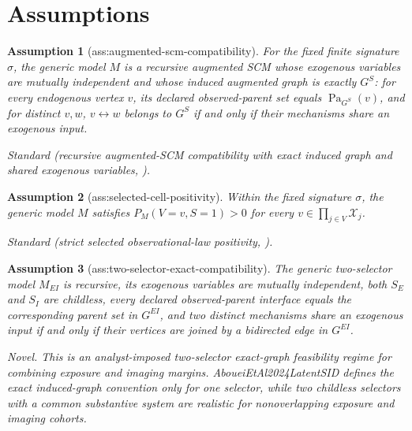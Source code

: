 \documentclass{article}
\newtheorem{assumption}{Assumption}
\begin{document}
\section{Assumptions}

\begin{assumption}[ass:augmented-scm-compatibility]\label{ass:augmented-scm-compatibility}
For the fixed finite signature \(\sigma\), the generic model \(M\) is a recursive augmented SCM whose exogenous variables are mutually independent and whose induced augmented graph is exactly \(G^S\): for every endogenous vertex \(v\), its declared observed-parent set equals \(\operatorname{Pa}_{G^S}(v)\), and for distinct \(v,w\), \(v\leftrightarrow w\) belongs to \(G^S\) if and only if their mechanisms share an exogenous input.
\par\smallskip\noindent\emph{Standard} (recursive augmented-SCM compatibility with exact induced graph and shared exogenous variables, \cite{AboueiEtAl2024LatentSID}).
\end{assumption}

\begin{assumption}[ass:selected-cell-positivity]\label{ass:selected-cell-positivity}
Within the fixed signature \(\sigma\), the generic model \(M\) satisfies \(P_M(V=v,S=1)>0\) for every \(v\in\prod_{j\in V}\mathcal X_j\).
\par\smallskip\noindent\emph{Standard} (strict selected observational-law positivity, \cite{AboueiEtAl2024LatentSID}).
\end{assumption}

\begin{assumption}[ass:two-selector-exact-compatibility]\label{ass:two-selector-exact-compatibility}
The generic two-selector model \(M_{EI}\) is recursive, its exogenous variables are mutually independent, both \(S_E\) and \(S_I\) are childless, every declared observed-parent interface equals the corresponding parent set in \(G^{EI}\), and two distinct mechanisms share an exogenous input if and only if their vertices are joined by a bidirected edge in \(G^{EI}\).
\par\smallskip\noindent\emph{Novel.} This is an analyst-imposed two-selector exact-graph feasibility regime for combining exposure and imaging margins. AboueiEtAl2024LatentSID defines the exact induced-graph convention only for one selector, while two childless selectors with a common substantive system are realistic for nonoverlapping exposure and imaging cohorts.
\end{assumption}
\end{document}
